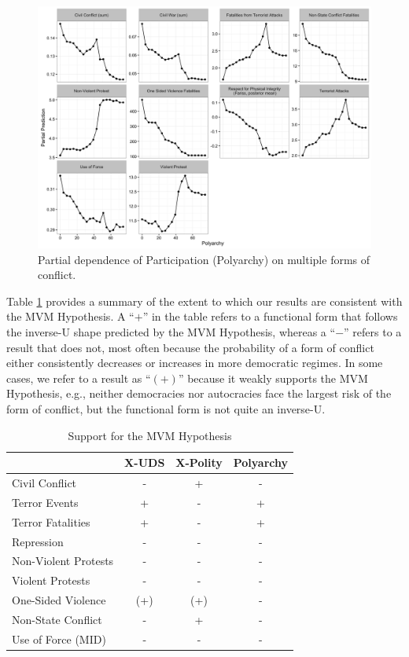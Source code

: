 \documentclass[titlepage, onecolumn,12pt]{article}
\begin{document}
\begin{figure}[ht!]
\begin{center}
\includegraphics[width=170mm]{../figures/part.png}
\end{center}
\caption{Partial dependence of Participation (Polyarchy) on multiple forms of conflict.}
\label{part}
\end{figure}

\clearpage

Table \ref{results} provides a summary of the extent to which our results are consistent with the MVM Hypothesis.  A ``$+$'' in the table refers to a functional form that follows the inverse-U shape predicted by the MVM Hypothesis, whereas a ``$-$'' refers to a result that does not, most often because the probability of a form of conflict either consistently decreases or increases in more democratic regimes.  In some cases, we refer to a result as ``$(+)$'' because it weakly supports the MVM Hypothesis, e.g., neither democracies nor autocracies face the largest risk of the form of conflict, but the functional form is not quite an inverse-U.

\begin{center}
\begin{table}[h!]
\centering \caption{Support for the MVM Hypothesis}
\bigskip
\label{results}
\normalsize
\begin{tabular}{l c | c |c }
\hline\hline
&\multicolumn{1}{c}{X-UDS}&\multicolumn{1}{c}{X-Polity}&\multicolumn{1}{c}{Polyarchy}\\
\hline\hline
Civil Conflict       & - & + & - \\
Terror Events       & + & - & + \\
Terror Fatalities   & + & - & + \\
Repression          & - & - & - \\
Non-Violent Protests& - & - & - \\
Violent Protests    & - & - & - \\
One-Sided Violence  & (+) & (+)& - \\
Non-State Conflict  & - & + & - \\
Use of Force (MID)  & - & - & - \\
\hline\hline
\end{tabular}
\end{table}
\end{center}
\end{document}
